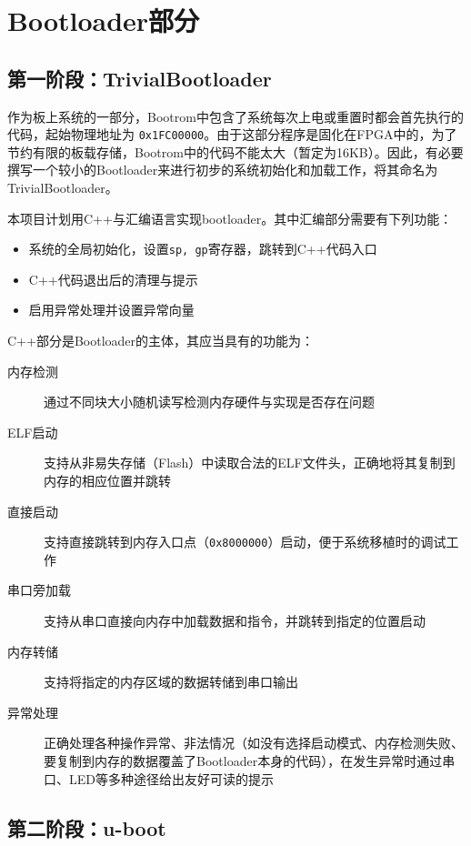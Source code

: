 \chapter{Bootloader部分}

\section{第一阶段：TrivialBootloader}

作为板上系统的一部分，Bootrom中包含了系统每次上电或重置时都会首先执行的代码，起始物理地址为 \texttt{0x1FC00000}。由于这部分程序是固化在FPGA中的，为了节约有限的板载存储，Bootrom中的代码不能太大（暂定为16KB）。因此，有必要撰写一个较小的Bootloader来进行初步的系统初始化和加载工作，将其命名为TrivialBootloader。

本项目计划用C++与汇编语言实现bootloader。其中汇编部分需要有下列功能：

\begin{itemize}
    \item 系统的全局初始化，设置\texttt{sp, gp}寄存器，跳转到C++代码入口
    \item C++代码退出后的清理与提示
    \item 启用异常处理并设置异常向量
\end{itemize}
C++部分是Bootloader的主体，其应当具有的功能为：

\begin{description}
    \item[内存检测] 通过不同块大小随机读写检测内存硬件与实现是否存在问题
    \item[ELF启动] 支持从非易失存储（Flash）中读取合法的ELF文件头，正确地将其复制到内存的相应位置并跳转
    \item[直接启动] 支持直接跳转到内存入口点（\texttt{0x8000000}）启动，便于系统移植时的调试工作
    \item[串口旁加载] 支持从串口直接向内存中加载数据和指令，并跳转到指定的位置启动
    \item[内存转储] 支持将指定的内存区域的数据转储到串口输出
    \item[异常处理] 正确处理各种操作异常、非法情况（如没有选择启动模式、内存检测失败、要复制到内存的数据覆盖了Bootloader本身的代码），在发生异常时通过串口、LED等多种途径给出友好可读的提示
\end{description}

\section{第二阶段：u-boot}